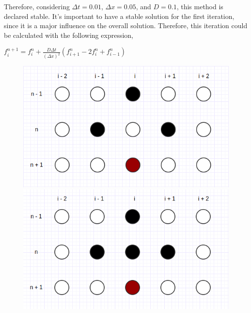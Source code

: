 \documentclass[12pt]{article}
\begin{document}
Therefore, considering $\Delta t = 0.01$, $\Delta x = 0.05$, and $D = 0.1$, this method is declared stable. It's important to have a stable solution for the first iteration, since it is a major influence on the overall solution\cite{heat_transfer}. Therefore, this iteration could be calculated with the following expression,

\begin{center}
\Large
$
f_{i}^{n + 1} = f_{i}^{n} + \frac{D \Delta t}{(\Delta x)^2}(f_{i + 1}^{n} - 2f_{i}^{n} + f_{i - 1}^{n})
$
\end{center}

\begin{figure}[!htb]
\centering
\begin{minipage}{.5\textwidth}
  \centering
  \includegraphics[width=.8\linewidth]{richardson.png}
\end{minipage}%
\begin{minipage}{.5\textwidth}
  \centering
  \includegraphics[width=.8\linewidth]{dufort-frankel.png}
\end{minipage}
\end{figure}
\end{document}

